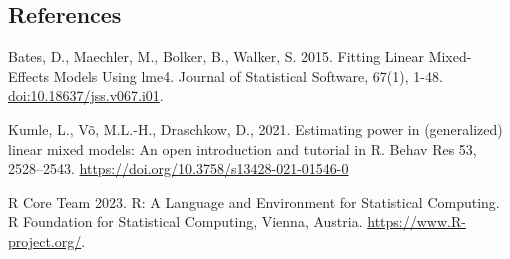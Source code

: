 \documentclass[
]{article}
\begin{document}
\newpage

\hypertarget{references}{%
\subsection{References}\label{references}}

Bates, D., Maechler, M., Bolker, B., Walker, S. 2015. Fitting Linear
Mixed-Effects Models Using lme4. Journal of Statistical Software, 67(1),
1-48. \url{doi:10.18637/jss.v067.i01}.

Kumle, L., Võ, M.L.-H., Draschkow, D., 2021. Estimating power in
(generalized) linear mixed models: An open introduction and tutorial in
R. Behav Res 53, 2528--2543.
\url{https://doi.org/10.3758/s13428-021-01546-0}

R Core Team 2023. R: A Language and Environment for Statistical
Computing. R Foundation for Statistical Computing, Vienna, Austria.
\url{https://www.R-project.org/}.
\end{document}
